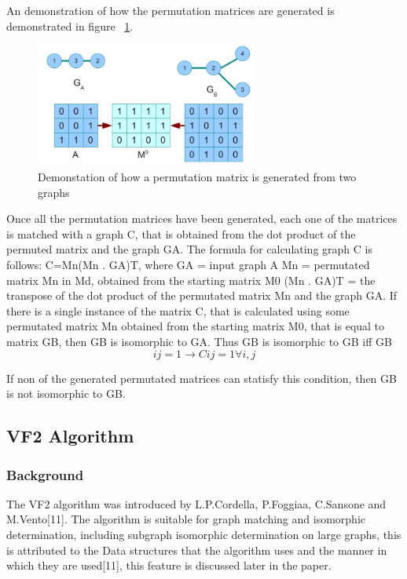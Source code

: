 An demonstration of how the permutation matrices are generated is demonstrated in figure ~\ref{fig:permutationmatrix}.

\begin{figure}[H]
  \begin{center}
      \includegraphics[width=0.65\textwidth]{permutationmatrix.png}
  \end{center}    
  \caption{Demonstation of how a permutation matrix is generated from two graphs} 
  \label{fig:permutationmatrix}
\end{figure} 

Once all the permutation matrices have been generated, each one of the matrices is matched with a graph C, that is obtained from the dot product of the permuted matrix and the graph G{\tiny A}.
The formula for calculating graph C is follows:
C=Mn(Mn . G{\tiny A})T, where
G{\tiny A} = input graph A
Mn = permutated matrix Mn in Md, obtained from the starting matrix M0
(Mn . G{\tiny A})T = the transpose of the dot product of the permutated matrix Mn and the graph G{\tiny A}.
If there is a single instance of the matrix C, that is calculated using some permutated matrix Mn obtained from the starting matrix M0, that is equal to matrix G{\tiny B}, then G{\tiny B} is isomorphic to G{\tiny A}. Thus G{\tiny B} is isomorphic to G{\tiny B} iff G{\tiny B}
  \begin{equation}	
	ij = 1 \rightarrow  Cij = 1 \forall i,j
  \end{equation} 


If non of the generated permutated matrices can statisfy this condition, then G{\tiny B} is not isomorphic to G{\tiny B}.
\newpage

 \subsection{VF2 Algorithm}
\label{VF2 Algorithm}

\subsubsection{Background}
 The VF2 algorithm was introduced by L.P.Cordella, P.Foggiaa, C.Sansone and M.Vento[11]. The algorithm is suitable for graph matching and isomorphic determination, including subgraph isomorphic determination on large graphs, this is attributed to the Data structures that the algorithm uses and the manner in which they are used[11], this feature is discussed later in the paper.

